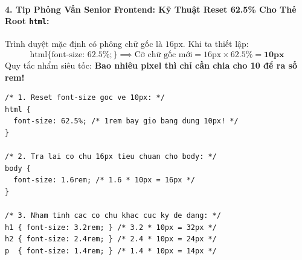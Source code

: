 \documentclass[11pt,oneside]{book}
\newcommand{\codeinline}[1]{\textcolor{accentOrange}{\texttt{#1}}}
\begin{document}
\paragraph{4. Tip Phỏng Vấn Senior Frontend: Kỹ Thuật Reset 62.5\% Cho Thẻ Root \codeinline{html}:}

\begin{conceptBox}
Trình duyệt mặc định có phông chữ gốc là $16\text{px}$. Khi ta thiết lập:
\[
\text{html} \{ \text{font-size: } 62.5\%; \} \implies \text{Cỡ chữ gốc mới} = 16\text{px} \times 62.5\% = \mathbf{10\text{px}}
\]
Quy tắc nhẩm siêu tốc: \textbf{Bao nhiêu pixel thì chỉ cần chia cho 10 để ra số rem!}
\end{conceptBox}

\begin{codeWindow}
\begin{lstlisting}[language=CSS3]
/* 1. Reset font-size goc ve 10px: */
html {
  font-size: 62.5%; /* 1rem bay gio bang dung 10px! */
}

/* 2. Tra lai co chu 16px tieu chuan cho body: */
body {
  font-size: 1.6rem; /* 1.6 * 10px = 16px */
}

/* 3. Nham tinh cac co chu khac cuc ky de dang: */
h1 { font-size: 3.2rem; } /* 3.2 * 10px = 32px */
h2 { font-size: 2.4rem; } /* 2.4 * 10px = 24px */
p  { font-size: 1.4rem; } /* 1.4 * 10px = 14px */
\end{lstlisting}
\end{codeWindow}
\end{document}

